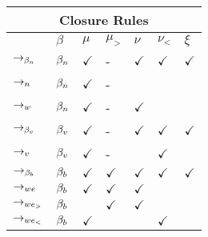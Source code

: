 \begin{table}[htbp]
	\centering
	\begin{tabularx}{\linewidth}{|X|XXXXXX|}
		\hline
		\multicolumn{7}{|c|}{\textbf{Closure Rules}}\\
		\hline
		       & {$\beta$} & $\mu$        & $\mu_>$     & $\nu$        & $\nu_<$      & $\xi$ \\
		\hline
		$\to_{\beta_n}$   & $\beta_n$ & $\checkmark$ & -           & $\checkmark$ & $\checkmark$ & $\checkmark$ \\
		\hline
		$\to_n$    & $\beta_n$ & $\checkmark$ & -           & 						 &              & \\
		\hline
		$\to_w$    & $\beta_n$ & $\checkmark$ & -           & $\checkmark$ &              & \\
		\hline
    $\to_{\beta_v}$   & $\beta_v$ & $\checkmark$ & -           & $\checkmark$ & $\checkmark$ & $\checkmark$ \\
    \hline
    $\to_v$    & $\beta_v$ & $\checkmark$ & -           & 						 & $\checkmark$ & \\
    \hline
    $\to_{\beta_b}$ & $\beta_b$ & $\checkmark$ & $\checkmark$ & $\checkmark$ & $\checkmark$ & $\checkmark$ \\
    \hline
    $\to_{we}$   & $\beta_b$ & $\checkmark$ & $\checkmark$ & $\checkmark$ &              & \\
    \hline
    $\to_{we_>}$  & $\beta_b$ &              & $\checkmark$ & $\checkmark$ &              & \\
    \hline
    $\to_{we_<}$  & $\beta_b$ & $\checkmark$ &              &              & $\checkmark$ & \\
    \hline
	\end{tabularx}
	\end{table}

